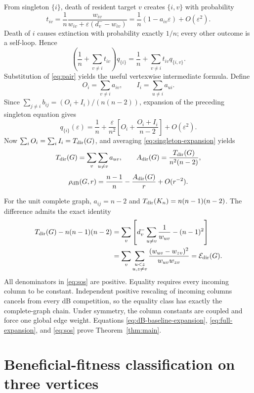 \documentclass[11pt]{article}
\newcommand{\dB}{\mathrm{dB}}
\begin{document}
From singleton $\{i\}$, death of resident target $v$ creates $\{i,v\}$ with
probability
\[
 t_{iv}=\frac1n\frac{w_{iv}}
 {w_{iv}+\varepsilon(d_v^- -w_{iv})}
 =\frac1n(1-a_{iv}\varepsilon)+O(\varepsilon^2).
\]
Death of $i$ causes extinction with probability exactly $1/n$; every other
outcome is a self-loop.  Hence
\[
 \left(\frac1n+\sum_{v\ne i}t_{iv}\right)q_{\{i\}}
 =\frac1n+\sum_{v\ne i}t_{iv}q_{\{i,v\}}.
\]
Substitution of \eqref{eq:pair} yields the useful vertexwise intermediate
formula.  Define
\[
 O_i=\sum_{v\ne i}a_{iv},\qquad I_i=\sum_{u\ne i}a_{ui}.
\]
Since
$\sum_{j\ne i}b_{ij}=(O_i+I_i)/(n(n-2))$, expansion of the preceding
singleton equation gives
\begin{equation}\label{eq:singleton-expansion}
 q_{\{i\}}(\varepsilon)
 =\frac1n+\frac{\varepsilon}{n^2}
 \left[O_i+\frac{O_i+I_i}{n-2}\right]+O(\varepsilon^2).
\end{equation}
Now $\sum_iO_i=\sum_iI_i=T_{\rm dir}(G)$, and averaging
\eqref{eq:singleton-expansion} yields
\[
 T_{\rm dir}(G)=\sum_v\sum_{u\ne v}a_{uv},\qquad
 A_{\rm dir}(G)=\frac{T_{\rm dir}(G)}{n^2(n-2)},
\]
\begin{equation}\label{eq:full-expansion}
 \rho_{\dB}(G,r)
 =\frac{n-1}{n}-\frac{A_{\rm dir}(G)}r+O(r^{-2}).
\end{equation}

For the unit complete graph, $a_{ij}=n-2$ and
$T_{\rm dir}(K_n)=n(n-1)(n-2)$.  The difference admits the exact identity
\begin{align}
 T_{\rm dir}(G)-n(n-1)(n-2)
 &=\sum_v\left[
 d_v^-\sum_{u\ne v}\frac1{w_{uv}}-(n-1)^2\right] \notag\\
 &=\sum_v\sum_{\substack{u<z\\u,z\ne v}}
 \frac{(w_{uv}-w_{zv})^2}{w_{uv}w_{zv}}
 =\mathcal E_{\rm dir}(G).                            \label{eq:sos}
\end{align}
All denominators in \eqref{eq:sos} are positive.  Equality requires every
incoming column to be constant.  Independent positive rescaling of incoming
columns cancels from every dB competition, so the equality class has exactly
the complete-graph chain.  Under symmetry, the column constants are coupled
and force one global edge weight.  Equations
\eqref{eq:dB-baseline-expansion}, \eqref{eq:full-expansion}, and
\eqref{eq:sos} prove Theorem~\ref{thm:main}.

\section{Beneficial-fitness classification on three vertices}
\end{document}
